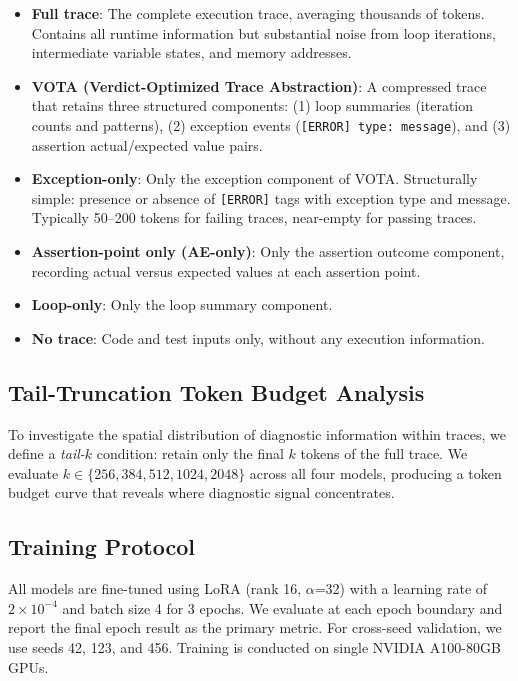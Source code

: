 \documentclass[11pt,a4paper]{article}
\begin{document}
\begin{itemize}
\item \textbf{Full trace}: The complete execution trace, averaging thousands of tokens. Contains all runtime information but substantial noise from loop iterations, intermediate variable states, and memory addresses.
\item \textbf{VOTA (Verdict-Optimized Trace Abstraction)}: A compressed trace that retains three structured components: (1) loop summaries (iteration counts and patterns), (2) exception events (\texttt{[ERROR] type: message}), and (3) assertion actual/expected value pairs.
\item \textbf{Exception-only}: Only the exception component of VOTA. Structurally simple: presence or absence of \texttt{[ERROR]} tags with exception type and message. Typically 50--200 tokens for failing traces, near-empty for passing traces.
\item \textbf{Assertion-point only (AE-only)}: Only the assertion outcome component, recording actual versus expected values at each assertion point.
\item \textbf{Loop-only}: Only the loop summary component.
\item \textbf{No trace}: Code and test inputs only, without any execution information.
\end{itemize}

\subsection{Tail-Truncation Token Budget Analysis}

To investigate the spatial distribution of diagnostic information within traces, we define a \emph{tail-$k$} condition: retain only the final $k$ tokens of the full trace. We evaluate $k \in \{256, 384, 512, 1024, 2048\}$ across all four models, producing a token budget curve that reveals where diagnostic signal concentrates.

\subsection{Training Protocol}

All models are fine-tuned using LoRA (rank 16, $\alpha$=32) with a learning rate of $2 \times 10^{-4}$ and batch size 4 for 3 epochs. We evaluate at each epoch boundary and report the final epoch result as the primary metric. For cross-seed validation, we use seeds 42, 123, and 456. Training is conducted on single NVIDIA A100-80GB GPUs.
\end{document}
